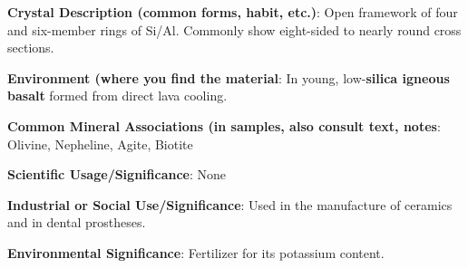\documentclass[10pt]{article}
\begin{document}
\begin{framed}
  \textbf{Crystal Description (common forms, habit, etc.)}: Open framework of four and six-member rings of Si/Al. Commonly show eight-sided to nearly round cross sections.
\end{framed}

\begin{framed}
  \textbf{Environment (where you find the material}:  In young, low-\textbf{silica igneous basalt} formed from direct lava cooling.
\end{framed}

\begin{framed}
  \textbf{Common Mineral Associations (in samples, also consult text, notes}:  Olivine, Nepheline, Agite, Biotite
\end{framed}

\begin{framed}
  \textbf{Scientific Usage/Significance}: None
\end{framed}

\begin{framed}
  \textbf{Industrial or Social Use/Significance}:  Used in the manufacture of ceramics and in dental prostheses.
\end{framed}

\begin{framed}
  \textbf{Environmental Significance}:  Fertilizer for its potassium content.
\end{framed}

\end{document}
